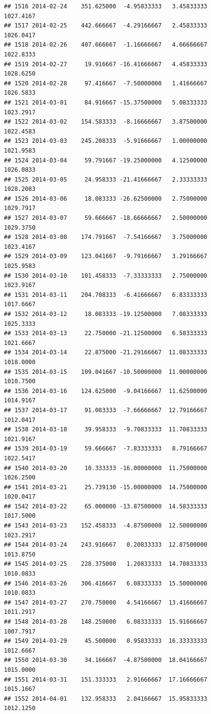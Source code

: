 \documentclass[
]{article}
\begin{document}
\begin{verbatim}
## 1516 2014-02-24    351.625000  -4.95833333   3.45833333    1027.4167
## 1517 2014-02-25    442.666667  -4.29166667   2.45833333    1026.0417
## 1518 2014-02-26    407.666667  -1.16666667   4.66666667    1022.8333
## 1519 2014-02-27     19.916667 -16.41666667   4.45833333    1028.6250
## 1520 2014-02-28     97.416667  -7.50000000   1.41666667    1026.5833
## 1521 2014-03-01     84.916667 -15.37500000   5.08333333    1023.2917
## 1522 2014-03-02    154.583333  -8.16666667   3.87500000    1022.4583
## 1523 2014-03-03    245.208333  -5.91666667   1.00000000    1021.9583
## 1524 2014-03-04     59.791667 -19.25000000   4.12500000    1026.0833
## 1525 2014-03-05     24.958333 -21.41666667   2.33333333    1028.2083
## 1526 2014-03-06     18.083333 -26.62500000   2.75000000    1029.7917
## 1527 2014-03-07     59.666667 -18.66666667   2.50000000    1029.3750
## 1528 2014-03-08    174.791667  -7.54166667   3.75000000    1023.4167
## 1529 2014-03-09    123.041667  -9.79166667   3.29166667    1025.9583
## 1530 2014-03-10    101.458333  -7.33333333   2.75000000    1023.9167
## 1531 2014-03-11    204.708333  -6.41666667   6.83333333    1017.6667
## 1532 2014-03-12     18.083333 -19.12500000   7.08333333    1025.3333
## 1533 2014-03-13     22.750000 -21.12500000   6.58333333    1021.6667
## 1534 2014-03-14     22.875000 -21.29166667  11.08333333    1018.0000
## 1535 2014-03-15    109.041667 -10.50000000  11.00000000    1010.7500
## 1536 2014-03-16    124.625000  -9.04166667  11.62500000    1014.9167
## 1537 2014-03-17     91.083333  -7.66666667  12.79166667    1012.0417
## 1538 2014-03-18     39.958333  -9.70833333  11.70833333    1021.9167
## 1539 2014-03-19     59.666667  -7.83333333   8.79166667    1022.5417
## 1540 2014-03-20     10.333333 -16.00000000  11.75000000    1026.2500
## 1541 2014-03-21     25.739130 -15.00000000  14.75000000    1020.0417
## 1542 2014-03-22     65.000000 -13.87500000  14.58333333    1017.5000
## 1543 2014-03-23    152.458333  -4.87500000  12.50000000    1023.2917
## 1544 2014-03-24    243.916667   0.20833333  12.87500000    1013.8750
## 1545 2014-03-25    228.375000   1.20833333  14.70833333    1010.0833
## 1546 2014-03-26    306.416667   6.08333333  15.50000000    1010.0833
## 1547 2014-03-27    270.750000   4.54166667  13.41666667    1011.2917
## 1548 2014-03-28    148.250000   6.08333333  15.91666667    1007.7917
## 1549 2014-03-29     45.500000   0.95833333  16.33333333    1012.6667
## 1550 2014-03-30     34.166667  -4.87500000  18.04166667    1015.0000
## 1551 2014-03-31    151.333333   2.91666667  17.16666667    1015.1667
## 1552 2014-04-01    132.958333   2.04166667  15.95833333    1012.1250

\end{verbatim}
\end{document}
